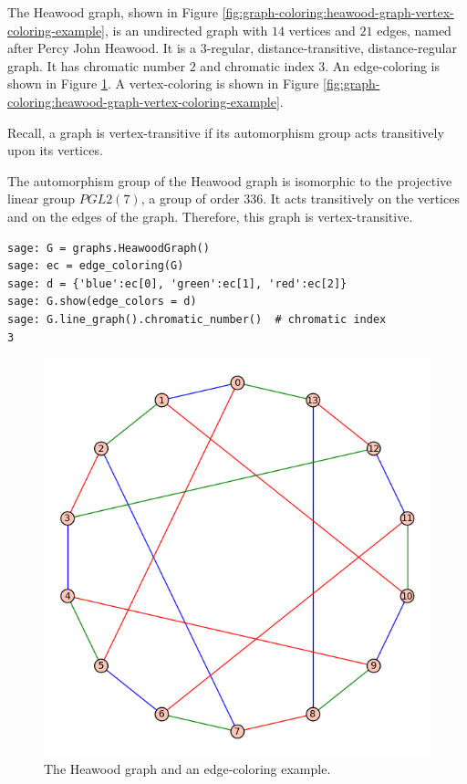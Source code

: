 \begin{example}
\label{example:graph-coloring:heawood-graph-example}
The Heawood graph, shown in Figure
\ref{fig:graph-coloring:heawood-graph-vertex-coloring-example},
is an undirected graph with $14$ vertices and $21$ edges, named after
Percy John Heawood.
It is a $3$-regular, distance-transitive, distance-regular graph.
It has chromatic number $2$ and chromatic index $3$.
An edge-coloring is shown in Figure
\ref{fig:graph-coloring:heawood-graph-edge-coloring-example}.
A vertex-coloring is shown in Figure
\ref{fig:graph-coloring:heawood-graph-vertex-coloring-example}.

Recall, a graph is vertex-transitive if its automorphism
group acts transitively upon its vertices.

The automorphism group of the Heawood graph is isomorphic to the
projective linear group $PGL2(7)$, a group of order $336$. It acts
transitively on the vertices and on the edges of the
graph. Therefore, this graph is vertex-transitive.

\begin{lstlisting}
sage: G = graphs.HeawoodGraph()
sage: ec = edge_coloring(G)
sage: d = {'blue':ec[0], 'green':ec[1], 'red':ec[2]}
sage: G.show(edge_colors = d)
sage: G.line_graph().chromatic_number()  # chromatic index
3
\end{lstlisting}


\begin{figure}[!htbp]
\centering
\includegraphics[scale=0.7]{image/graph-coloring/heawood-graph-edge-coloring-example}
\caption{The Heawood graph and an edge-coloring example.}
\label{fig:graph-coloring:heawood-graph-edge-coloring-example}
\end{figure}



\end{example}
